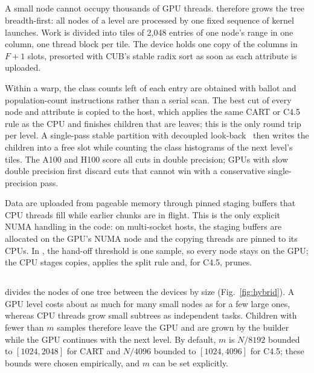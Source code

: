 \subsection{\ImplGpu}
\label{sec:impl-gpu}

A small node cannot occupy thousands of GPU threads. \ImplGpu{} therefore grows the tree breadth-first: all nodes of a level are processed by one fixed sequence of kernel launches. Work is divided into tiles of 2,048 entries of one node's range in one column, one thread block per tile. The device holds one copy of the columns in $F+1$ slots, presorted with CUB's stable radix sort as soon as each attribute is uploaded.

Within a warp, the class counts left of each entry are obtained with ballot and population-count instructions rather than a serial scan. The best cut of every node and attribute is copied to the host, which applies the same CART or C4.5 rule as the CPU and finishes children that are leaves; this is the only round trip per level. A single-pass stable partition with decoupled look-back~\cite{merrill2016scan} then writes the children into a free slot while counting the class histograms of the next level's tiles. The A100 and H100 score all cuts in double precision; GPUs with slow double precision first discard cuts that cannot win with a conservative single-precision pass.

Data are uploaded from pageable memory through pinned staging buffers that CPU threads fill while earlier chunks are in flight. This is the only explicit NUMA handling in the code: on multi-socket hosts, the staging buffers are allocated on the GPU's NUMA node and the copying threads are pinned to its CPUs. In \ImplGpu{}, the hand-off threshold is one sample, so every node stays on the GPU; the CPU stages copies, applies the split rule and, for C4.5, prunes.

\subsection{\ImplHybrid}
\label{sec:impl-hybrid}

\ImplHybrid{} divides the nodes of one tree between the devices by size (Fig.~\ref{fig:hybrid}). A GPU level costs about as much for many small nodes as for a few large ones, whereas CPU threads grow small subtrees as independent tasks. Children with fewer than $m$ samples therefore leave the GPU and are grown by the \ImplParallel{} builder while the GPU continues with the next level. By default, $m$ is $N/8192$ bounded to $[1024, 2048]$ for CART and $N/4096$ bounded to $[1024, 4096]$ for C4.5; these bounds were chosen empirically, and $m$ can be set explicitly.

